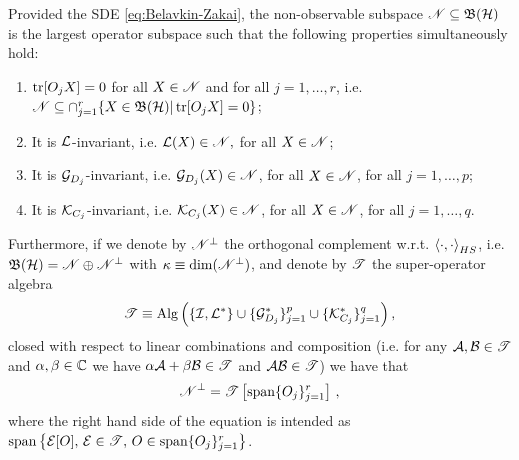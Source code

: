 \documentclass[aihp,12pt]{imsart}
\begin{document}
\begin{proposition}
        \label{prop:non-observable}
    \label{prop:observable_construction}
    Provided the SDE \eqref{eq:Belavkin-Zakai}, the non-observable subspace  $\mathscr{N}\subseteq\mathfrak{B}(\mathcal{H})$ is the largest operator subspace such that the following properties simultaneously hold: 
    \begin{enumerate}
        \item ${\rm tr}[O_jX]=0$ for all $X\in\mathscr{N}$ and for all $j=1,\dots,r$, i.e. $\mathscr{N}\subseteq\cap_{j=1}^r\{X\in\mathfrak{B}(\mathcal{H})|\, {\rm tr}[O_j X]=0\}$;
        \item It is $\mathcal{L}$-invariant, i.e. $\mathcal{L}(X)\in\mathscr{N},$ for all $ X\in\mathscr{N}$;
        \item It is $\mathcal{G}_{D_j}$-invariant, i.e. \(\mathcal{G}_{D_j}(X)\in\mathscr{N}\), for all $X\in\mathscr{N}$, for all $j=1,\dots,p$;
        \item It is $\mathcal{K}_{C_j}$-invariant, i.e. \(\mathcal{K}_{C_j}(X)\in\mathscr{N}\), for all $X\in\mathscr{N}$, for all $j=1,\dots,q$.
    \end{enumerate}     

    Furthermore, if we denote by $\mathscr{N}^\perp$ the orthogonal complement w.r.t. $\left< \cdot,\cdot \right>_{HS}$, i.e. $\mathfrak{B}(\mathcal{H})=\mathscr{N}\oplus\mathscr{N}^\perp$ with $\kappa\equiv\dim(\mathscr{N}^\perp)$, and denote by $\mathscr{T}$ the super-operator algebra $$\mathscr{T} \equiv {\rm Alg}\left(\{\mathcal{I}, {\mathcal{L}}^*\}\cup\{\mathcal{G}_{D_j}^*\}_{j=1}^p \cup\{\mathcal{K}_{C_j}^*\}_{j=1}^q \right),$$ closed with respect to linear combinations and composition (i.e. for any $\mathcal{A},\mathcal{B}\in\mathscr{T}$ and $\alpha,\beta\in\mathbb{C}$ we have $\alpha\mathcal{A}+\beta\mathcal{B}\in\mathscr{T}$ and $\mathcal{A}\mathcal{B}\in\mathscr{T}$) we have that 
    \begin{equation}
        \mathscr{N}^\perp = \mathscr{T} \left[{\rm span}\{O_j\}_{j=1}^r\right]\,,
        \label{eq:observable_diffusive}
    \end{equation}
    where the right hand side of the equation is intended as ${\rm span}\left\{\mathcal{E}[O], \, \mathcal{E}\in\mathscr{T}, \, O\in{\rm span}\{O_j\}_{j=1}^r\right\}$.
\end{proposition}
\end{document}
